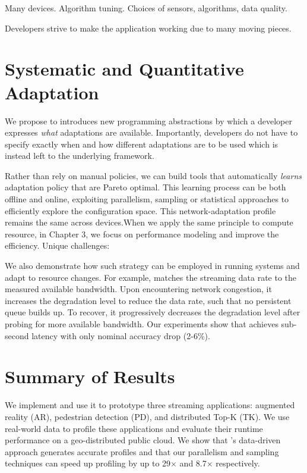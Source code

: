 \documentclass[thesis.tex]{subfiles}
\begin{document}
 Many devices. Algorithm tuning. Choices of sensors,
algorithms, data quality.

 Developers strive to make the
application working due to many moving pieces.

\section{Systematic and Quantitative Adaptation}
\label{sec:adaptation}

 We propose to introduces new programming
abstractions by which a developer expresses \emph{what} adaptations are
available. Importantly, developers do not have to specify exactly when and how
different adaptations are to be used which is instead left to the underlying
framework.

 Rather than rely on manual policies, we
can build tools that automatically \emph{learns} adaptation policy that are
Pareto optimal. This learning process can be both offline and online, exploiting
parallelism, sampling or statistical approaches to efficiently explore the
configuration space. This network-adaptation profile remains the same across
devices.When we apply the same principle to compute resource, in Chapter 3, we
focus on performance modeling and improve the efficiency. Unique challenges:

We also demonstrate how such strategy can be employed in running systems and
adapt to resource changes. For example, \sysname{} matches the streaming data
rate to the measured available bandwidth. Upon encountering network congestion,
it increases the degradation level to reduce the data rate, such that no
persistent queue builds up. To recover, it progressively decreases the
degradation level after probing for more available bandwidth. Our experiments
show that \sysname{} achieves sub-second latency with only nominal accuracy drop
(2-6\%).

\section{Summary of Results}
\label{sec:summary-results-1}

We implement \awstream{} and use it to prototype three streaming applications:
augmented reality (AR), pedestrian detection (PD), and distributed Top-K
(TK). We use real-world data to profile these applications and evaluate their
runtime performance on a geo-distributed public cloud.  We show that
\awstream{}'s data-driven approach generates accurate profiles and that our
parallelism and sampling techniques can speed up profiling by up to 29$\times$
and 8.7$\times$ respectively.
\end{document}
